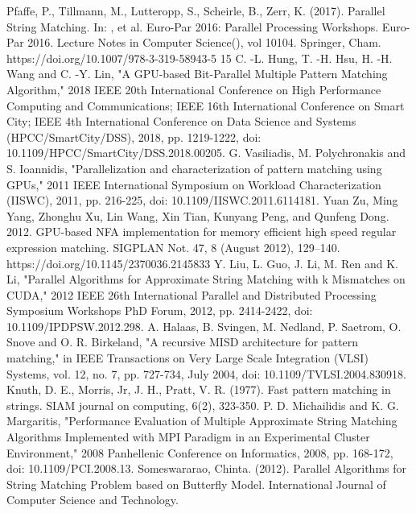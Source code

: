\documentclass[11pt]{article}       %
\begin{document}
\begin{thebibliography}{99}  
Pfaffe, P., Tillmann, M., Lutteropp, S., Scheirle, B., Zerr, K. (2017). Parallel String Matching. In: , et al. Euro-Par 2016: Parallel Processing Workshops. Euro-Par 2016. Lecture Notes in Computer Science(), vol 10104. Springer, Cham. {https://doi.org/10.1007/978-3-319-58943-5 15}
C. -L. Hung, T. -H. Hsu, H. -H. Wang and C. -Y. Lin, "A GPU-based Bit-Parallel Multiple Pattern Matching Algorithm," 2018 IEEE 20th International Conference on High Performance Computing and Communications; IEEE 16th International Conference on Smart City; IEEE 4th International Conference on Data Science and Systems (HPCC/SmartCity/DSS), 2018, pp. 1219-1222, doi: 10.1109/HPCC/SmartCity/DSS.2018.00205.
G. Vasiliadis, M. Polychronakis and S. Ioannidis, "Parallelization and characterization of pattern matching using GPUs," 2011 IEEE International Symposium on Workload Characterization (IISWC), 2011, pp. 216-225, doi: 10.1109/IISWC.2011.6114181.
Yuan Zu, Ming Yang, Zhonghu Xu, Lin Wang, Xin Tian, Kunyang Peng, and Qunfeng Dong. 2012. GPU-based NFA implementation for memory efficient high speed regular expression matching. SIGPLAN Not. 47, 8 (August 2012), 129–140. https://doi.org/10.1145/2370036.2145833
Y. Liu, L. Guo, J. Li, M. Ren and K. Li, "Parallel Algorithms for Approximate String Matching with k Mismatches on CUDA," 2012 IEEE 26th International Parallel and Distributed Processing Symposium Workshops PhD Forum, 2012, pp. 2414-2422, doi: 10.1109/IPDPSW.2012.298.
A. Halaas, B. Svingen, M. Nedland, P. Saetrom, O. Snove and O. R. Birkeland, "A recursive MISD architecture for pattern matching," in IEEE Transactions on Very Large Scale Integration (VLSI) Systems, vol. 12, no. 7, pp. 727-734, July 2004, doi: 10.1109/TVLSI.2004.830918.
Knuth, D. E., Morris, Jr, J. H., Pratt, V. R. (1977). Fast pattern matching in strings. SIAM journal on computing, 6(2), 323-350.
P. D. Michailidis and K. G. Margaritis, "Performance Evaluation of Multiple Approximate String Matching Algorithms Implemented with MPI Paradigm in an Experimental Cluster Environment," 2008 Panhellenic Conference on Informatics, 2008, pp. 168-172, doi: 10.1109/PCI.2008.13.
Someswararao, Chinta. (2012). Parallel Algorithms for String Matching Problem based on Butterfly Model. International Journal of Computer Science and Technology. 

\end{thebibliography}
\end{document}
